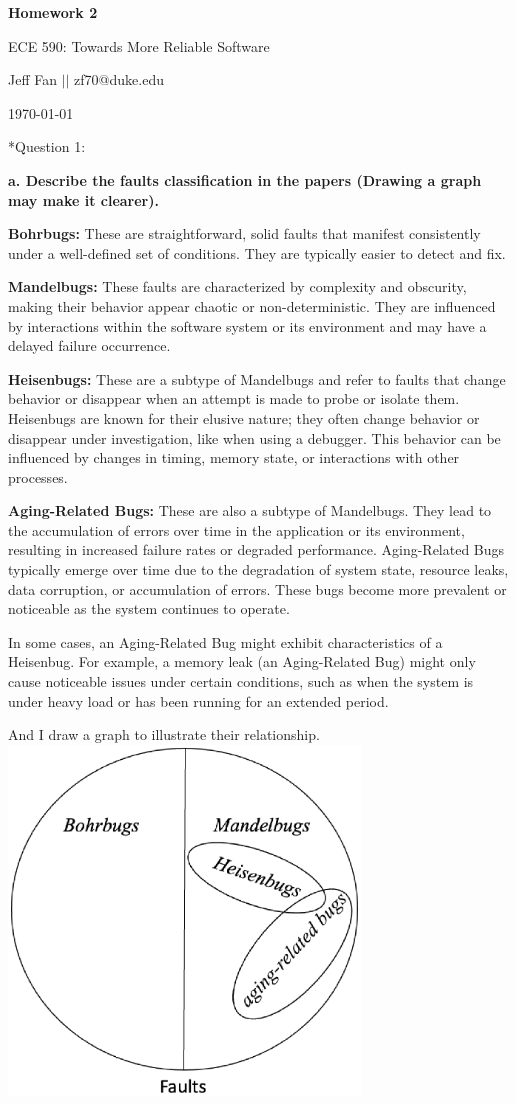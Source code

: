 \documentclass[12pt]{article}
\makeatletter
\numberwithin{table}{section}
\newcommand{\question}[2][]{\begin{flushleft}
		\Large\textbf{Question #1}: \large\textit{#2}
		
\end{flushleft}}
\newcommand{\maketitletwo}[2][]{\begin{center}
		\Large{\textbf{Homework #1}
			
			ECE 590: Towards More Reliable Software} %
		\vspace{5pt}
		
		\normalsize{Jeff Fan  \hspace{1em} $\left|\right|$ \hspace{1em}zf70@duke.edu  %
			
			\today}        %
		\vspace{15pt}
		
\end{center}}
\makeatother
\begin{document}
	\maketitletwo[2]  %
	
	\section*{Question 1: } 
	
	\textbf{a. Describe the faults classification in the papers (Drawing a graph may make  it clearer).}
	
	\textbf{Bohrbugs:} These are straightforward, solid faults that manifest consistently under a well-defined set of conditions. They are typically easier to detect and fix.
	
	\textbf{Mandelbugs:} These faults are characterized by complexity and obscurity, making their behavior appear chaotic or non-deterministic. They are influenced by interactions within the software system or its environment and may have a delayed failure occurrence.
	
	\textbf{Heisenbugs:} These are a subtype of Mandelbugs and refer to faults that change behavior or disappear when an attempt is made to probe or isolate them. Heisenbugs are known for their elusive nature; they often change behavior or disappear under investigation, like when using a debugger. This behavior can be influenced by changes in timing, memory state, or interactions with other processes.
	
	\textbf{Aging-Related Bugs:} These are also a subtype of Mandelbugs. They lead to the accumulation of errors over time in the application or its environment, resulting in increased failure rates or degraded performance. Aging-Related Bugs typically emerge over time due to the degradation of system state, resource leaks, data corruption, or accumulation of errors. These bugs become more prevalent or noticeable as the system continues to operate.
	
	In some cases, an Aging-Related Bug might exhibit characteristics of a Heisenbug. For example, a memory leak (an Aging-Related Bug) might only cause noticeable issues under certain conditions, such as when the system is under heavy load or has been running for an extended period. 
	
	And I draw a graph to illustrate their relationship.\\
	\includegraphics[width=0.7\textwidth]{1.eps}
	
\end{document}
